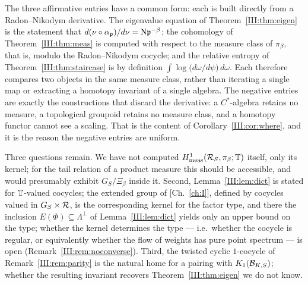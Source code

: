 The three affirmative entries have a common form: each is built directly from a
Radon--Nikodym derivative. The eigenvalue equation of Theorem~\ref{III:thm:eigen} is the
statement that $d(\nu\circ\alpha_{\mathfrak{p}})/d\nu=\mathrm{N}\mathfrak{p}^{-\beta}$; the cohomology of
Theorem~\ref{III:thm:meas} is computed with respect to the measure class of $\pi_\beta$, that is,
modulo the Radon--Nikodym cocycle; and the relative entropy of
Theorem~\ref{III:thm:staircase} is by definition
$\int\log\bigl(d\omega/d\psi\bigr)\,d\omega$. Each therefore compares two objects in the
same measure class, rather than iterating a single map or extracting a homotopy invariant of
a single algebra. The negative entries are exactly the constructions that discard the
derivative: a $C^*$-algebra retains no measure, a topological groupoid retains no measure
class, and a homotopy functor cannot see a scaling. That is the content of Corollary~\ref{III:cor:where}, and it is the reason the
negative entries are uniform.

Three questions remain. We have not computed $H^1_{\mathrm{meas}}(\mathcal{R}_S,\pi_\beta;\mathbb{T})$
itself, only its kernel; for the tail relation of a product measure this should be
accessible, and would presumably exhibit $\widehat{G_S}/\Xi_\beta$ inside it. Second,
Lemma~\ref{III:lem:dict} is stated for $\mathbb{T}$-valued cocycles; the extended group of
[Ch.~\ref{ch:I}], defined by cocycles valued in $G_S\times\mathcal{R}$, is the corresponding kernel for
the factor type, and there the inclusion $E(\Phi)\subseteq\Lambda^\perp$ of
Lemma~\ref{III:lem:dict} yields only an upper bound on the type; whether the kernel determines
the type --- i.e.\ whether the cocycle is regular, or equivalently whether the flow of weights
has pure point spectrum --- is open (Remark~\ref{III:rem:noconverse}). Third, the twisted cyclic $1$-cocycle
of Remark~\ref{III:rem:parity} is the natural home for a pairing with $K_1(\mathcal{B}_{K,S})$; whether
the resulting invariant recovers Theorem~\ref{III:thm:eigen} we do not know.

